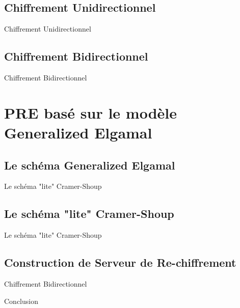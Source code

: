 \documentclass{beamer}
\begin{document}
\subsection{Chiffrement Unidirectionnel}
\begin{frame}{Chiffrement Unidirectionnel}
	
\end{frame}

\subsection{Chiffrement Bidirectionnel}
\begin{frame}{Chiffrement Bidirectionnel}
	
\end{frame}

\section{PRE basé sur le modèle Generalized Elgamal}
\subsection{Le schéma Generalized Elgamal}
\begin{frame}{Le schéma "lite" Cramer-Shoup}
	
\end{frame}

\subsection{Le schéma "lite" Cramer-Shoup}
\begin{frame}{Le schéma "lite" Cramer-Shoup}
	
\end{frame}

\subsection{Construction de Serveur de Re-chiffrement}
\begin{frame}{Chiffrement Bidirectionnel}
	
\end{frame}




\begin{frame}{Conclusion}
\end{frame}
\end{document}
